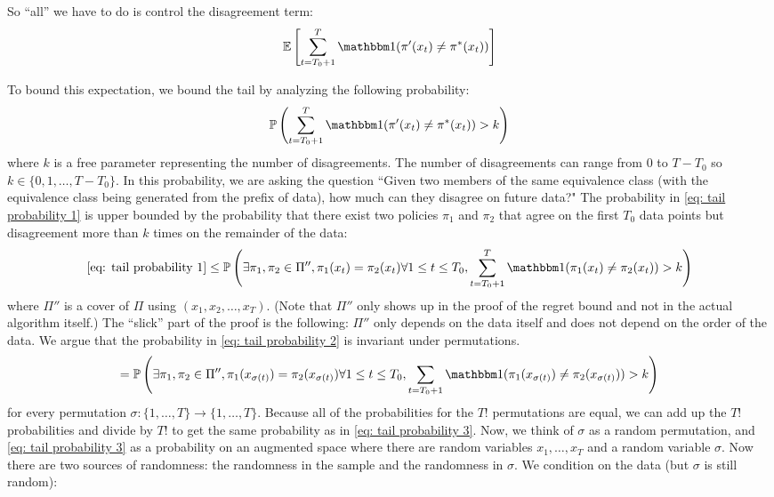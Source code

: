 \documentclass[11pt]{article}
\begin{document}
So ``all'' we have to do is control the disagreement term:
\begin{equation}
\E{\sum_{t=T_0+1}^T\ind(\pi'(x_t)\neq \pi^*(x_t))} \label{eq: disagreement term}
\end{equation}

To bound this expectation, we bound the tail by analyzing the following probability:
\begin{equation}\label{eq: tail probability 1}
\prob{\sum_{t=T_0+1}^T\ind(\pi'(x_t)\neq \pi^*(x_t))>k}
\end{equation}
where $k$ is a free parameter representing the number of disagreements.  The number of disagreements can range from $0$ to $T-T_0$ so $k \in \{0,1,\ldots,T-T_0\}$. In this probability, we are asking the question ``Given two members of the same equivalence class (with the equivalence class being generated from the prefix of data), how much can they disagree on future data?" The probability in \eqref{eq: tail probability 1} is upper bounded by the probability that there exist two policies $\pi_1$ and $\pi_2$ that agree on the first $T_0$ data points but disagreement more than $k$ times on the remainder of the data:
\begin{equation}\label{eq: tail probability 2}
\eqref{eq: tail probability 1}\le \prob{\exists \pi_1,\pi_2 \in \Pi'', \pi_1(x_t) = \pi_2(x_t) \forall 1 \le t \le T_0, \sum_{t=T_0+1}^T\ind(\pi_1(x_t)\neq \pi_2(x_t)) > k}
\end{equation}
where $\Pi''$ is a cover of $\Pi$ using $(x_1,x_2,\ldots,x_T)$. (Note that $\Pi''$ only shows up in the proof of the regret bound and not in the actual algorithm itself.) The ``slick'' part of the proof is the following: $\Pi''$ only depends on the data itself and does not depend on the order of the data. We argue that the probability in \eqref{eq: tail probability 2} is invariant under permutations. 
\begin{equation}\label{eq: tail probability 3}
=\prob{\exists \pi_1,\pi_2 \in \Pi'', \pi_1(x_{\sigma(t)})= \pi_2(x_{\sigma(t)}) \forall 1 \le t \le T_0, \sum_{t=T_0+1} \ind(\pi_1(x_{\sigma(t)})\neq \pi_2(x_{\sigma(t)})) > k}
\end{equation} 
for every permutation $\sigma: \{1,\ldots,T\} \rightarrow \{1,\ldots,T\}$. Because all of the probabilities for the $T!$ permutations are equal, we can add up the $T!$ probabilities and divide by $T!$ to get the same probability as in \eqref{eq: tail probability 3}. Now, we think of $\sigma$ as a random permutation, and \eqref{eq: tail probability 3} as a probability on an augmented space where there are random variables $x_1,\ldots, x_T$ and a random variable $\sigma$. Now there are two sources of randomness: the randomness in the sample and the randomness in $\sigma$. We condition on the data (but $\sigma$ is still random):
\end{document}
